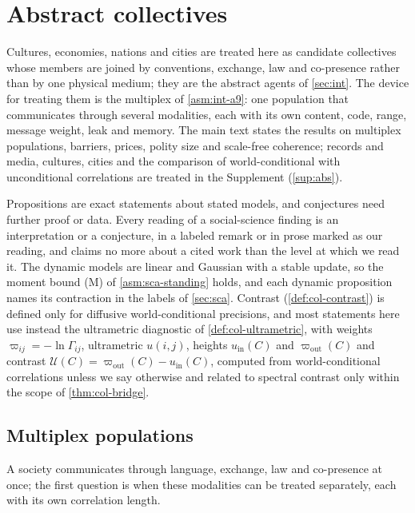 \section{Abstract collectives}\label{sec:abs}

Cultures, economies, nations and cities are treated here as candidate collectives whose members are joined by conventions, exchange, law and co-presence rather than by one physical medium; they are the abstract agents of \cref{sec:int}. The device for treating them is the multiplex of \cref{asm:int-a9}: one population that communicates through several modalities, each with its own content, code, range, message weight, leak and memory. The main text states the results on multiplex populations, barriers, prices, polity size and scale-free coherence; records and media, cultures, cities and the comparison of world-conditional with unconditional correlations are treated in the Supplement (\cref{sup:abs}).

Propositions are exact statements about stated models, and conjectures need further proof or data. Every reading of a social-science finding is an interpretation or a conjecture, in a labeled remark or in prose marked as our reading, and claims no more about a cited work than the level at which we read it. The dynamic models are linear and Gaussian with a stable update, so the moment bound (M) of \cref{asm:sca-standing} holds, and each dynamic proposition names its contraction in the labels of \cref{sec:sca}. Contrast (\cref{def:col-contrast}) is defined only for diffusive world-conditional precisions, and most statements here use instead the ultrametric diagnostic of \cref{def:col-ultrametric}, with weights $\varpi_{ij}=-\ln\Gamma_{ij}$, ultrametric $u(i,j)$, heights $u_{\mathrm{in}}(C)$ and $\varpi_{\mathrm{out}}(C)$ and contrast $\mathcal U(C)=\varpi_{\mathrm{out}}(C)-u_{\mathrm{in}}(C)$, computed from world-conditional correlations unless we say otherwise and related to spectral contrast only within the scope of \cref{thm:col-bridge}.

\subsection{Multiplex populations}\label{sec:abs-multiplex}

A society communicates through language, exchange, law and co-presence at once; the first question is when these modalities can be treated separately, each with its own correlation length.


